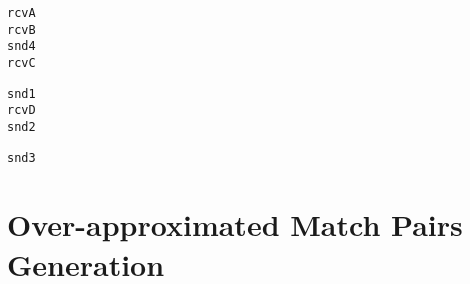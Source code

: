 
\newsavebox{\boxtaskzero}
\begin{lrbox}{\boxtaskzero}
\begin{minipage}[c]{0.2\linewidth}
\begin{alltt}
    rcvA
    rcvB
    snd4
    rcvC
\end{alltt}
\end{minipage}
\end{lrbox}

\newsavebox{\boxtaskone}
\begin{lrbox}{\boxtaskone}
\begin{minipage}[c]{0.2\linewidth}
\begin{alltt}
    snd1
    rcvD
    snd2
\end{alltt}
\end{minipage}
\end{lrbox}

\newsavebox{\boxtasktwo}
\begin{lrbox}{\boxtasktwo}
\begin{minipage}[c]{0.2\linewidth}
\begin{alltt}
    snd3
\end{alltt}
\end{minipage}
\end{lrbox}

\section{ Over-approximated Match Pairs Generation}


